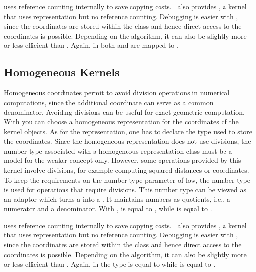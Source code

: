  uses reference counting internally to
save copying costs. \cgal\ also provides
, a kernel that uses
 representation but no reference
counting.  Debugging is easier with
, since the coordinates are
stored within the class and hence direct access to the coordinates is
possible.  Depending on the algorithm, it can also be slightly more or
less efficient than . Again, in
 both
 and
 are mapped to
.

\subsection{Homogeneous Kernels}
Homogeneous coordinates permit to avoid division operations in
numerical computations, since the additional coordinate can serve as a
common denominator.  Avoiding divisions can be useful for exact
geometric computation.  With  you can
choose a homogeneous representation for the coordinates of the kernel
objects. As for the  representation, one
has to declare the type used to store the coordinates. Since the
homogeneous representation does not use divisions, the number type
associated with a homogeneous representation class must be a model for
the weaker concept  only. However, some operations
provided by this kernel involve divisions, for example computing
squared distances or  coordinates. To
keep the requirements on the number type parameter of
 low, the number type
 is used for operations that require
divisions. This number type can be viewed as an adaptor which turns a
 into a . It maintains numbers as
quotients, i.e., a numerator and a denominator. With
,
 is equal to
, while
 is equal to
.

 uses reference counting internally
to save copying costs. \cgal\ also provides
, a kernel that uses
 representation but no reference
counting. Debugging is easier with
, since the coordinates are
stored within the class and hence direct access to the coordinates is
possible. Depending on the algorithm, it can also be slightly more or
less efficient than . Again, in
 the type
 is equal to
 while
 is equal to
.


